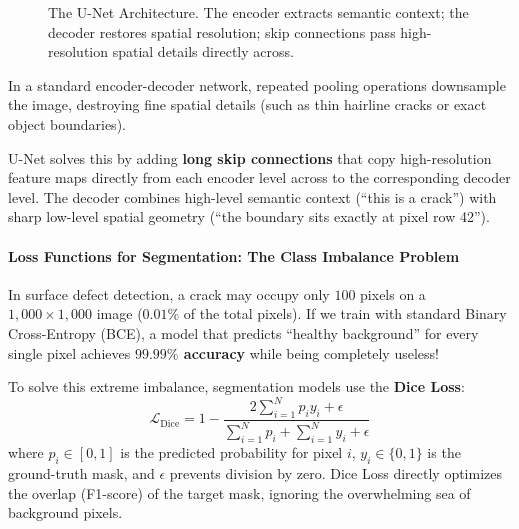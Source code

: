 \begin{figure}[htbp]
\caption{The U-Net Architecture. The encoder extracts semantic context; the decoder restores spatial resolution; skip connections pass high-resolution spatial details directly across.}\label{fig:unet}
\end{figure}

\begin{keyidea}
In a standard encoder-decoder network, repeated pooling operations downsample the image, destroying fine spatial details (such as thin hairline cracks or exact object boundaries). 

U-Net solves this by adding \textbf{long skip connections} that copy high-resolution feature maps directly from each encoder level across to the corresponding decoder level. The decoder combines high-level semantic context (``this is a crack'') with sharp low-level spatial geometry (``the boundary sits exactly at pixel row 42'').
\end{keyidea}

\paragraph{Loss Functions for Segmentation: The Class Imbalance Problem}
In surface defect detection, a crack may occupy only $100$ pixels on a $1{,}000 \times 1{,}000$ image ($0.01\%$ of the total pixels). If we train with standard Binary Cross-Entropy (BCE), a model that predicts ``healthy background'' for every single pixel achieves \textbf{$99.99\%$ accuracy} while being completely useless!

To solve this extreme imbalance, segmentation models use the \textbf{Dice Loss}:
\begin{equation}
\mathcal{L}_{\text{Dice}} = 1 - \frac{2 \sum_{i=1}^N p_i y_i + \epsilon}{\sum_{i=1}^N p_i + \sum_{i=1}^N y_i + \epsilon}\label{eq:dice_loss}
\end{equation}
where $p_i \in [0, 1]$ is the predicted probability for pixel $i$, $y_i \in \{0, 1\}$ is the ground-truth mask, and $\epsilon$ prevents division by zero. Dice Loss directly optimizes the overlap (F1-score) of the target mask, ignoring the overwhelming sea of background pixels.

